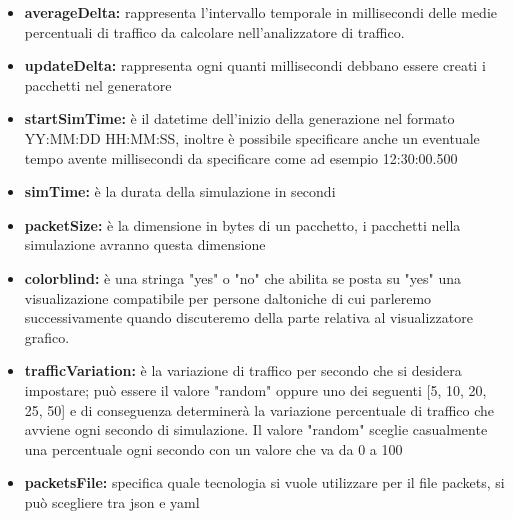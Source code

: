 \documentclass[binding=0.6cm]{sapthesis}
\begin{document}
\begin{itemize}
    \item \textbf{averageDelta:} rappresenta l'intervallo temporale in millisecondi 
    delle medie percentuali di traffico da calcolare nell'analizzatore di traffico.
    \item \textbf{updateDelta:} rappresenta ogni quanti millisecondi debbano essere creati i pacchetti nel generatore
    \item \textbf{startSimTime:} è il datetime dell'inizio della generazione nel formato \newline
    YY:MM:DD HH:MM:SS, inoltre è possibile specificare anche un eventuale tempo avente millisecondi da specificare come ad esempio 
    12:30:00.500
    \item \textbf{simTime:} è la durata della simulazione in secondi
    \item \textbf{packetSize:} è la dimensione in bytes di un pacchetto, i pacchetti nella simulazione avranno questa dimensione
    \item \textbf{colorblind:} è una stringa "yes" o "no" che abilita se posta su "yes" una visualizazione compatibile per persone daltoniche
    di cui parleremo successivamente quando discuteremo della parte relativa al visualizzatore grafico.
    \item \textbf{trafficVariation:} è la variazione di traffico per secondo che si desidera impostare; 
    può essere il valore "random" oppure uno dei seguenti [5, 10, 20, 25, 50] e 
    di conseguenza determinerà la variazione percentuale di traffico che avviene 
    ogni secondo di simulazione. Il valore "random" sceglie casualmente una percentuale 
    ogni secondo con un valore che va da 0 a 100
    \item \textbf{packetsFile:} specifica quale tecnologia si vuole utilizzare per il file packets, 
    si può scegliere tra json e yaml
\end{itemize}
\end{document}
